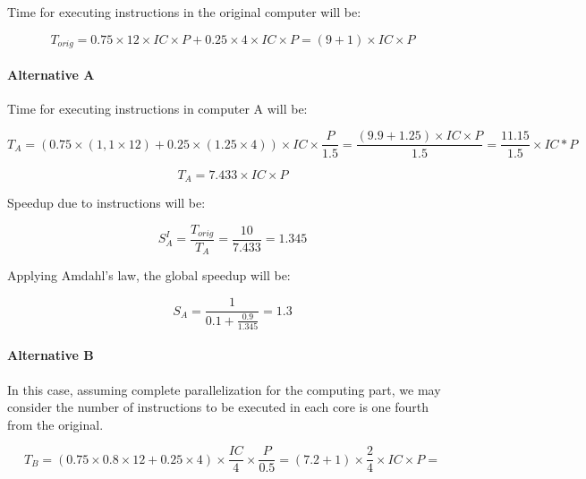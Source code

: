 

\begin{comparchsol}
\end{comparchsol}

Time for executing instructions in the original computer will be:

\begin{equation}
T_{orig} = 
0.75 \times 12 \times IC \times P + 0.25 \times 4 \times IC \times P = 
(9+1) \times IC \times P
\end{equation}

\paragraph{Alternative A}

Time for executing instructions in computer A will be:

\begin{equation}
T_{A} =
(0.75 \times (1,1 \times 12) + 0.25 \times (1.25 \times 4)) \times IC \times \frac{P}{1.5} = 
\frac{(9.9 + 1.25) \times IC  \times P}{1.5} = 
\frac{11.15}{1.5} \times IC * P 
\end{equation}

\begin{equation}
T_{A} = 7.433 \times IC \times P
\end{equation}

Speedup due to instructions will be:

\begin{equation}
S_{A}^{I} = 
\frac{T_{orig}}{T_{A}} = 
\frac{10}{7.433} = 
1.345
\end{equation}

Applying Amdahl's law, the global speedup will be:

\begin{equation}
S_{A} = \frac{1}{0.1 + \frac{0.9}{1.345}} = 1.3
\end{equation}

\paragraph{Alternative B}

In this case, assuming complete parallelization for the computing part,
we may consider the number of instructions to be executed in each core is
one fourth from the original.

\begin{equation}
T_{B} = 
(0.75 \times 0.8 \times 12 + 0.25 \times 4) \times \frac{IC}{4} \times \frac{P}{0.5} = 
( 7.2 + 1) \times \frac{2}{4} \times IC \times P = 
\end{equation}

